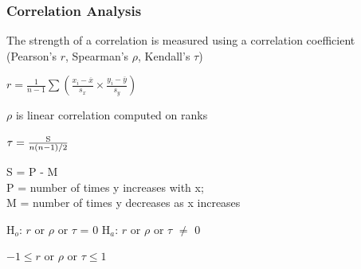 \documentclass[10pt]{beamer}
\begin{document}
\begin{frame}[fragile]
\frametitle{Correlation Analysis}
\bi
\item The strength of a correlation is measured using a
correlation coefficient (Pearson's $r$, Spearman's $\rho$, Kendall's $\tau$)

\hspace{5ex}$r = \frac{1}{n-1} \sum 
     \left( 
        \frac{x_{i}-{\overline x}}{s_{x}} \times 
        \frac{y_{i} - {\overline y}}{s_{y}} 
     \right)$

\hspace{5ex}$\rho$ is linear correlation computed on ranks

\hspace{5ex}$\tau = \frac{{\rm S}}{n(n-1)/2}$

{\scriptsize
\hspace{10ex}S = P - M\\
\hspace{10ex}P = number of times y increases with x;\\ 
\hspace{10ex}M = number of times y decreases as x increases\\
}

\item H$_{o}$: $r$ or $\rho$ or $\tau$ = 0 \hspace{0.5in} H$_{a}$: $r$ or $\rho$ or $\tau$  $\neq$ 0

\item $-1 \le r$ or $\rho$ or $\tau \le 1$
\ei
\end{frame}
\end{document}
